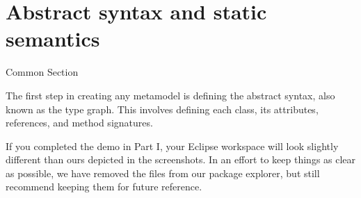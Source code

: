 \newpage
\section{Abstract syntax and static semantics}
\genHeader
\label{sec: staticSemantics}

Common Section

The first step in creating any metamodel is defining the abstract syntax, also known as the type graph. This involves defining each class, its attributes,
references, and method signatures.


If you completed the demo in Part I, your Eclipse workspace will look slightly different than ours depicted in the screenshots. In an effort to
keep things as clear as possible, we have removed the files from our package explorer, but still recommend keeping them for future reference.












 
